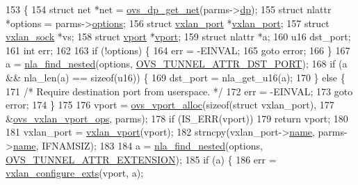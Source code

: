 \begin{DoxyCode}
153 \{
154     \textcolor{keyword}{struct }net *net = \hyperlink{datapath_8h_aef2302004ca1f45133eaef00bb3740eb}{ovs\_dp\_get\_net}(parms->\hyperlink{structvport__parms_a15faa866e3d35a721de77b347017499e}{dp});
155     \textcolor{keyword}{struct }nlattr *options = parms->\hyperlink{structvport__parms_a5c6027e758731e1a16968e77d4e2ca7c}{options};
156     \textcolor{keyword}{struct }\hyperlink{structvxlan__port}{vxlan\_port} *\hyperlink{structvxlan__port}{vxlan\_port};
157     \textcolor{keyword}{struct }\hyperlink{structvxlan__sock}{vxlan\_sock} *vs;
158     \textcolor{keyword}{struct }\hyperlink{structvport}{vport} *\hyperlink{structvport}{vport};
159     \textcolor{keyword}{struct }nlattr *a;
160     u16 dst\_port;
161     \textcolor{keywordtype}{int} err;
162 
163     \textcolor{keywordflow}{if} (!options) \{
164         err = -EINVAL;
165         \textcolor{keywordflow}{goto} error;
166     \}
167     a = \hyperlink{net_2netlink_8h_a5b73cd8f4a1d3d335642ee1492b7b2c2}{nla\_find\_nested}(options, \hyperlink{openvswitch_8h_a96a58e29e8dbf2b5bdeb775cba46556eae2bec9320cf2cc32228c9783e1bba39a}{OVS\_TUNNEL\_ATTR\_DST\_PORT});
168     \textcolor{keywordflow}{if} (a && nla\_len(a) == \textcolor{keyword}{sizeof}(u16)) \{
169         dst\_port = nla\_get\_u16(a);
170     \} \textcolor{keywordflow}{else} \{
171         \textcolor{comment}{/* Require destination port from userspace. */}
172         err = -EINVAL;
173         \textcolor{keywordflow}{goto} error;
174     \}
175 
176     vport = \hyperlink{linux_2vport_8c_a9198ee06111592d2cf6c3b2bf94561c1}{ovs\_vport\_alloc}(\textcolor{keyword}{sizeof}(\textcolor{keyword}{struct} vxlan\_port),
177                 &\hyperlink{linux_2vport-vxlan_8c_a14100e1b742c7bb52f41541582330814}{ovs\_vxlan\_vport\_ops}, parms);
178     \textcolor{keywordflow}{if} (IS\_ERR(vport))
179         \textcolor{keywordflow}{return} vport;
180 
181     vxlan\_port = \hyperlink{linux_2vport-vxlan_8c_ab19470f9c73474113f37dc3c65265294}{vxlan\_vport}(vport);
182     strncpy(vxlan\_port->\hyperlink{structvxlan__port_a48b3eb83bbca17229480cf0d7a130272}{name}, parms->\hyperlink{structvport__parms_a4f27e2a7b7dc0493c095cdaabe225b38}{name}, IFNAMSIZ);
183 
184     a = \hyperlink{net_2netlink_8h_a5b73cd8f4a1d3d335642ee1492b7b2c2}{nla\_find\_nested}(options, \hyperlink{openvswitch_8h_a96a58e29e8dbf2b5bdeb775cba46556ea310d573fc264521a7d47f37295666999}{OVS\_TUNNEL\_ATTR\_EXTENSION});
185     \textcolor{keywordflow}{if} (a) \{
186         err = \hyperlink{linux_2vport-vxlan_8c_a1c323f01bc67db23967f87810a23939b}{vxlan\_configure\_exts}(vport, a);

\end{DoxyCode}
